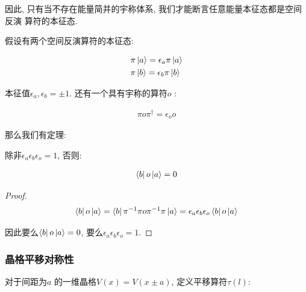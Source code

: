 因此, 只有当不存在能量简并的宇称体系, 我们才能断言任意能量本征态都是空间反演
算符的本征态.

假设有两个空间反演算符的本征态:

\begin{equation}
  \begin{aligned}
    &\pi \ket{a} = \epsilon_{a} \pi \ket{a}\\
    & \pi \ket{b} = \epsilon_{b} \pi \ket{b}
  \end{aligned}
\end{equation}

本征值$\epsilon_{a}, \epsilon_{b} = \pm 1$. 还有一个具有宇称的算符$o$ :

\begin{equation}
  \begin{aligned}
    \pi o \pi^{\dagger} = \epsilon_{o} o
  \end{aligned}
\end{equation}

那么我们有定理:

\begin{theorem}[宇称选择定则]
  除非$\epsilon_{a} \epsilon_{b} \epsilon_{o} = 1$, 否则:
  
  \begin{equation}
    \begin{aligned}
      \bra{b} o \ket{a} = 0
    \end{aligned}
  \end{equation}

\end{theorem}
\begin{proof}

  \begin{equation}
    \begin{aligned}
      \bra{b}o\ket{a} = \bra{b}\pi^{-1}\pi o \pi^{-1}\pi\ket{a} = \epsilon_{a}
      \epsilon_{b} \epsilon_{o} \bra{b} o \ket{a}
    \end{aligned}
  \end{equation}

  因此要么$\bra{b}o\ket{a} = 0$, 要么$\epsilon_{a} \epsilon_{b} \epsilon_{o}= 1$.

\end{proof}

\subsubsection{晶格平移对称性}

对于间距为$a$ 的一维晶格$V(x) = V(x\pm a)$, 定义平移算符$\tau(l)$:

